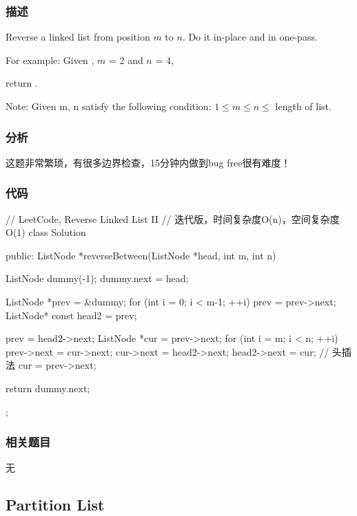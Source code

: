 \subsubsection{描述}
Reverse a linked list from position $m$ to $n$. Do it in-place and in one-pass.

For example:
Given , $m$ = 2 and $n$ = 4,

return .

Note:
Given m, n satisfy the following condition:
$1 \leq m \leq  n \leq $ length of list.


\subsubsection{分析}
这题非常繁琐，有很多边界检查，15分钟内做到bug free很有难度！


\subsubsection{代码}
\begin{Code}
// LeetCode, Reverse Linked List II
// 迭代版，时间复杂度O(n)，空间复杂度O(1)
class Solution {
public:
    ListNode *reverseBetween(ListNode *head, int m, int n) {
        ListNode dummy(-1);
        dummy.next = head;

        ListNode *prev = &dummy;
        for (int i = 0; i < m-1; ++i)
            prev = prev->next;
        ListNode* const head2 = prev;

        prev = head2->next;
        ListNode *cur = prev->next;
        for (int i = m; i < n; ++i) {
            prev->next = cur->next;
            cur->next = head2->next;
            head2->next = cur;  // 头插法
            cur = prev->next;
        }

        return dummy.next;
    }
};
\end{Code}


\subsubsection{相关题目}

\begindot
\item 无
\myenddot


\subsection{Partition List}
\label{sec:partition-list}


